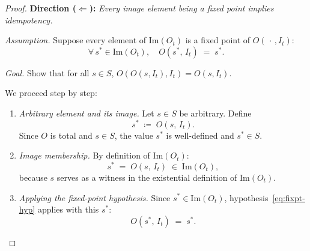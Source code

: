 \documentclass[12pt,openany]{book}
\newcommand{\calI}{\mathcal{I}}
\numberwithin{equation}{chapter}
\theoremstyle{plain}
\theoremstyle{definition}
\theoremstyle{remark}
\numberwithin{equation}{chapter}
\theoremstyle{plain}
\newcommand{\calS}{\mathcal{S}}
\def\calI{I}%
\def\calS{S}%
\begin{document}
\begin{proof}
\medskip
\noindent\textbf{Direction ($\Leftarrow$):}
\emph{Every image element being a fixed point implies idempotency.}

\medskip
\noindent\emph{Assumption.}  Suppose every element of $\mathrm{Im}(O_t)$
is a fixed point of $O(\,\cdot\,,\calI_t)$:
\begin{equation}
  \forall\, s^* \in \mathrm{Im}(O_t),\quad
  O(s^*,\,\calI_t) \;=\; s^*.
  \label{eq:fixpt-hyp}
\end{equation}

\noindent\emph{Goal.}  Show that for all $s \in \calS$,
$O(O(s,\calI_t),\calI_t) = O(s,\calI_t)$.

\medskip
\noindent We proceed step by step:
\begin{enumerate}
  \item \emph{Arbitrary element and its image.}
        Let $s \in \calS$ be arbitrary.  Define
        \begin{equation}
          s^* \;\coloneqq\; O(s,\,\calI_t).
          \label{eq:bwd-def}
        \end{equation}
        Since $O$ is total and $s \in \calS$, the value $s^*$ is
        well-defined and $s^* \in \calS$.

  \item \emph{Image membership.}
        By definition of $\mathrm{Im}(O_t)$:
        \begin{equation}
          s^* \;=\; O(s,\,\calI_t) \;\in\; \mathrm{Im}(O_t),
          \label{eq:bwd-mem}
        \end{equation}
        because $s$ serves as a witness in the existential definition of
        $\mathrm{Im}(O_t)$.

  \item \emph{Applying the fixed-point hypothesis.}
        Since $s^* \in \mathrm{Im}(O_t)$,
        hypothesis~\eqref{eq:fixpt-hyp} applies with this $s^*$:
        \begin{equation}
          O(s^*,\,\calI_t) \;=\; s^*.
          \label{eq:bwd-fp}
        \end{equation}


\end{enumerate}
\end{proof}
\end{document}
